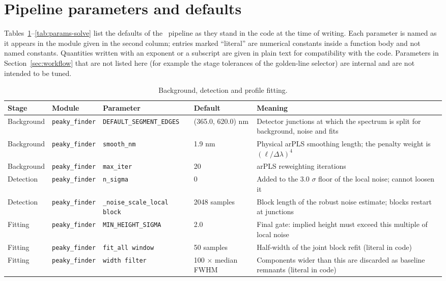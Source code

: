\section{Pipeline parameters and defaults}
\label{app:params}

Tables~\ref{tab:params-fit}--\ref{tab:params-solve} list the defaults of the \alibz\ pipeline as they stand in the code at the time of writing. Each parameter is named as it appears in the module given in the second column; entries marked ``literal'' are numerical constants inside a function body and not named constants. Quantities written with an exponent or a subscript are given in plain text for compatibility with the code. Parameters in Section~\ref{sec:workflow} that are not listed here (for example the stage tolerances of the golden-line selector) are internal and are not intended to be tuned.

\begin{table}[!htbp]
\centering
\caption{Background, detection and profile fitting.}
\label{tab:params-fit}
\scriptsize
\setlength{\tabcolsep}{4pt}
\begin{tabular}{@{}p{}p{}p{}p{}p{}@{}}
\toprule
Stage & Module & Parameter & Default & Meaning \\
\midrule
Background & \texttt{peaky\_\allowbreak{}finder} & \texttt{DEFAULT\_\allowbreak{}SEGMENT\_\allowbreak{}EDGES} & (365.0, 620.0) nm & Detector junctions at which the spectrum is split for background, noise and fits \\
Background & \texttt{peaky\_\allowbreak{}finder} & \texttt{smooth\_\allowbreak{}nm} & 1.9 nm & Physical arPLS smoothing length; the penalty weight is $(\ell/\Delta\lambda)^4$ \\
Background & \texttt{peaky\_\allowbreak{}finder} & \texttt{max\_\allowbreak{}iter} & 20 & arPLS reweighting iterations \\
Detection & \texttt{peaky\_\allowbreak{}finder} & \texttt{n\_\allowbreak{}sigma} & 0 & Added to the 3.0 $\sigma$ floor of the local noise; cannot loosen it \\
Detection & \texttt{peaky\_\allowbreak{}finder} & \texttt{\_\allowbreak{}noise\_\allowbreak{}scale\_\allowbreak{}local block} & 2048 samples & Block length of the robust noise estimate; blocks restart at junctions \\
Fitting & \texttt{peaky\_\allowbreak{}finder} & \texttt{MIN\_\allowbreak{}HEIGHT\_\allowbreak{}SIGMA} & 2.0 & Final gate: implied height must exceed this multiple of local noise \\
Fitting & \texttt{peaky\_\allowbreak{}finder} & \texttt{fit\_\allowbreak{}all window} & 50 samples & Half-width of the joint block refit (literal in code) \\
Fitting & \texttt{peaky\_\allowbreak{}finder} & \texttt{width filter} & 100 $\times$ median FWHM & Components wider than this are discarded as baseline remnants (literal in code) \\
\bottomrule
\end{tabular}
\end{table}

